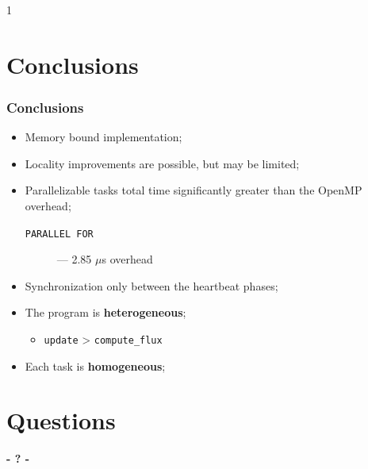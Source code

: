 1\documentclass{beamer}
\begin{document}
\section{Conclusions}
\begin{frame}
	\frametitle{Conclusions}
	\begin{itemize}
		\item{Memory bound implementation;}
		\item{Locality improvements are possible, but may be limited;}
		\item{Parallelizable tasks total time significantly greater than the OpenMP overhead;
			\begin{description}
				\item[\texttt{PARALLEL FOR}]{--- 2.85 $\mu$s overhead}
			\end{description}
		}
		\item{Synchronization only between the heartbeat phases;}
		\item{The program is \textbf{heterogeneous};
		\begin{itemize}
			\item{\texttt{update} > \texttt{compute\_flux}}
		\end{itemize}
		}
		\item{Each task is \textbf{homogeneous};}
	\end{itemize}
\end{frame}

\section{Questions}
\begin{frame}
	\titlepage
	\begin{center}
		\Huge\bfseries
		- ? -
	\end{center}
\end{frame}
\end{document}
